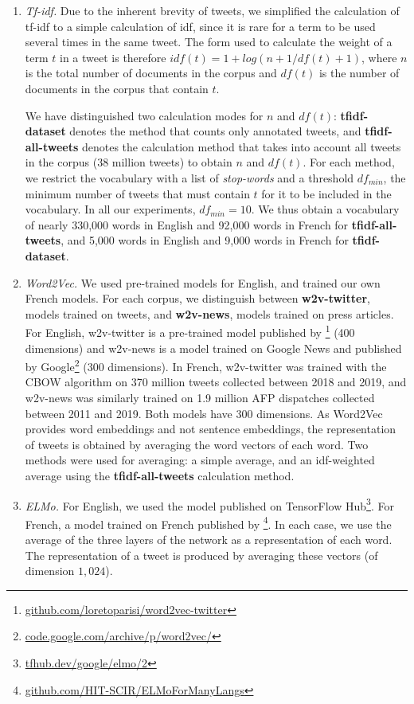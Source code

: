 \begin{enumerate}
    \item \textit{Tf-idf.} Due to the inherent brevity of tweets, we simplified the calculation of tf-idf to a simple calculation of idf, since it is rare for a term to be used several times in the same tweet. The form used to calculate the weight of a term $t$ in a tweet is therefore $idf(t) = 1 + log(n+1/df(t)+1)$, where $n$ is the total number of documents in the corpus and $df(t)$ is the number of documents in the corpus that contain $t$.
    
We have distinguished two calculation modes for $n$ and $df(t)$: \textbf{tfidf-dataset} denotes the method that counts only annotated tweets, and \textbf{tfidf-all-tweets} denotes the calculation method that takes into account all tweets in the corpus (38 million tweets) to obtain $n$ and $df(t)$. For each method, we restrict the vocabulary with a list of \textit{stop-words} and a threshold $df_{min}$, the minimum number of tweets that must contain $t$ for it to be included in the vocabulary. In all our experiments, $df_{min}=10$. We thus obtain a vocabulary of nearly 330,000 words in English and 92,000 words in French for \textbf{tfidf-all-tweets}, and 5,000 words in English and 9,000 words in French for \textbf{tfidf-dataset}.

\item \textit{Word2Vec.} We used pre-trained models for English, and trained our own French models. For each corpus, we distinguish between \textbf{w2v-twitter}, models trained on tweets, and \textbf{w2v-news}, models trained on press articles. For English, w2v-twitter is a pre-trained model published by \citet{godin2015multimedia}\footnote{\url{github.com/loretoparisi/word2vec-twitter}} (400 dimensions) and w2v-news is a model trained on Google News and published by Google\footnote{\url{code.google.com/archive/p/word2vec/}}  (300 dimensions). In French, w2v-twitter was trained with the CBOW algorithm on 370 million tweets collected between 2018 and 2019, and w2v-news was similarly trained on 1.9 million AFP dispatches collected between 2011 and 2019. Both models have 300 dimensions.
As Word2Vec provides word embeddings and not sentence embeddings, the representation of tweets is obtained by averaging the word vectors of each word. Two methods were used for averaging: a simple average, and an idf-weighted average using the \textbf{tfidf-all-tweets} calculation method.

\item \textit{ELMo.} For English, we used the model published on TensorFlow Hub\footnote{\url{tfhub.dev/google/elmo/2}}. For French, a model trained on French published by \citet{che2018towards}\footnote{\url{github.com/HIT-SCIR/ELMoForManyLangs}}. In each case, we use the average of the three layers of the network as a representation of each word. The representation of a tweet is produced by averaging these vectors (of dimension $1,024$).



\end{enumerate}
